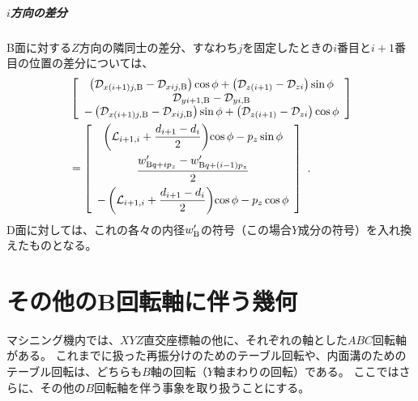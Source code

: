 \paragraph{$i$方向の差分}\noindent
B面に対する$Z$方向の隣同士の差分、すなわち$j$を固定したときの$i$番目と$i+1$番目の位置の差分については、
\begin{align*}
 &\left[
  \begin{array}{c}
    \left(\mathcal D_{x(i+1)j,\text B}-\mathcal D_{xij,\text B}\right)\cos\phi
    +\left(\mathcal D_{z(i+1)}-\mathcal D_{zi}\right)\sin\phi\\
    \mathcal D_{yi+1,\text B}-\mathcal D_{yi,\text B}\\
    -\left(\mathcal D_{x(i+1)j,\text B}-\mathcal D_{xij,\text B}\right)\sin\phi
    +\left(\mathcal D_{z(i+1)}-\mathcal D_{zi}\right)\cos\phi
  \end{array}
  \right]\\
 &= \left[
    \begin{array}{c}
      \displaystyle\left(\mathcal L_{i+1, i}+\frac{d_{i+1}-d_i}2\right)\!\cos\phi-p_z\sin\phi\\[10pt]
      \displaystyle\frac{w'_{\text Bq+ip_z}-w'_{\text Bq+(i-1)p_z}}2\\[8pt]
      \displaystyle-\left(\mathcal L_{i+1, i}+\frac{d_{i+1}-d_i}2\right)\!\cos\phi-p_z\cos\phi
    \end{array}
    \right]\ .
\end{align*}
D面に対しては、これの各々の内径$w_\text B'$の符号（この場合$Y$成分の符号）を入れ換えたものとなる。






\chapter[その他のB回転軸に伴う幾何]
        {その他のB回転軸に伴う幾何}
マシニング機内では、$XYZ$直交座標軸の他に、それぞれの軸とした$ABC$回転軸がある。
これまでに扱った再振分けのためのテーブル回転や、内面溝のためのテーブル回転は、どちらも$B$軸の回転（$Y$軸まわりの回転）である。
ここではさらに、その他の$B$回転軸を伴う事象を取り扱うことにする。



